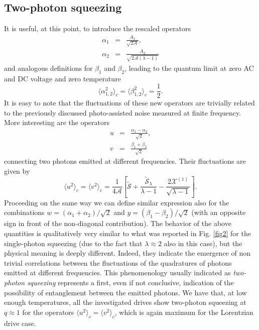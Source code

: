 \documentclass[twocolumn,showpacs,preprintnumbers,amsmath,amssymb%
 aps,
 prb,
 lengthcheck,%
]{revtex4-1}
\def\be{\begin{equation}}
\def\ee{\end{equation}}
\def\beq{\begin{eqnarray}}
\def\eeq{\end{eqnarray}}
\begin{document}
\subsection{Two-photon squeezing}
It is useful, at this point, to introduce the rescaled operators
\beq
\alpha_{1}&=& \frac{A_{1}}{\sqrt{2 \mathcal{A}}}, \\ 
\alpha_{2}&=& \frac{A_{2}}{\sqrt{2 \mathcal{A} (\lambda-1)}} 
\eeq
and analogous definitions for $\beta_{1}$ and $\beta_{2}$, leading to the quantum limit at zero AC and DC voltage and zero temperature
\be
 \langle \alpha^{2}_{1,2} \rangle_{c}= \langle \beta^{2}_{1,2} \rangle_{c}=\frac{1}{2}.
\ee
It is easy to note that the fluctuations of these new operators are trivially related to the previously discussed photo-assisted noise measured at finite frequency. More interesting are the operators 
\beq
u&=& \frac{\alpha_{1}-\alpha_{2}}{\sqrt{2}},\\
v&=& \frac{\beta_{1}+\beta_{2}}{\sqrt{2}}
\eeq
connecting two photons emitted at different frequencies. Their fluctuations are given by 
\begin{equation}
\langle u^{2} \rangle_{c}=\langle v^{2} \rangle_{c}=\frac{1}{4 \mathcal{A}} \left[\tilde{\mathcal{S}} +\frac{\tilde{\mathcal{S}}_{\lambda}}{\lambda-1}-\frac{2\mathcal{X}^{(1)}}{\sqrt{\lambda-1}} \right].
\end{equation} 
 Proceeding on the same way we can define similar expression also for the combinations $w= (\alpha_{1}+\alpha_{2})/\sqrt{2}$ and $y=(\beta_{1}-\beta_{2})/\sqrt{2}$ (with an opposite sign in front of the non-diagonal contribution). The behavior of the above quantities is qualitatively very similar to what was reported in Fig. \ref{fig2} for the single-photon squeezing (due to the fact that $\lambda\approx 2$ also in this case), but the physical meaning is deeply different. Indeed, they indicate the emergence of non trivial correlations between the fluctuations of the quadratures of photons emitted at different frequencies. This phenomenology usually indicated as \emph{two-photon squeezing} represents a first, even if not conclusive, indication of the possibility of entanglement between the emitted photons. We have that, at low enough temperatures, all the investigated drives show two-photon squeezing at $q\approx 1$ for the operators $\langle u^{2}\rangle_{c}= \langle v^{2} \rangle_{c}$, which is again maximum for the Lorentzian drive case. 
\end{document}
